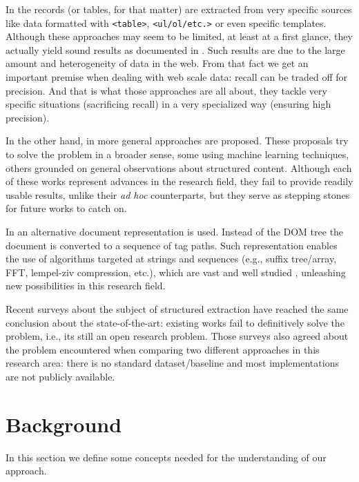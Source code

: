 \documentclass{vldb}
\begin{document}
In \cite{webtables2008, listExtract2009, tablesMS2012, tegra2015, topklists2013}
the records (or tables, for that matter) are extracted from very specific
sources like data formatted with \texttt{<table>}, \texttt{<ul/ol/etc.>} or even
specific templates. Although these approaches may seem to be limited, at least
at a first glance, they actually yield sound results as documented in
\cite{relationalWeb2008, probase, probase2012, acsdb}. Such results are due to
the large amount and heterogeneity of data in the web. From that fact we get an
important premise when dealing with web scale data: recall can be traded off for
precision. And that is what those approaches are all about, they tackle very
specific situations (sacrificing recall) in a very specialized way (ensuring
high precision).

In the other hand, in \cite{RRunner01, exalg2003, vips03, viper05, MDR03,
depta05, NET05, TPC09, vide10, gstm2010, fivatech2010, cvts2012, SuffixTree12,
clustVX2014, datapath2015, autorm2015} more general approaches are proposed.
These proposals try to solve the problem in a broader sense, some using machine
learning techniques, others grounded on general observations about structured
content. Although each of these works represent advances in the research field,
they fail to provide readily usable results, unlike their \textit{ad hoc}
counterparts, but they serve as stepping stones for future works to catch on.

In \cite{TPC09, SuffixTree12, TPS2013} an alternative document representation is
used. Instead of the DOM tree the document is converted to a sequence of tag
paths. Such representation enables the use of algorithms targeted at strings and
sequences (e.g., suffix tree/array\cite{ukkonen1995, manber1993suffix},
FFT\cite{fft1965}, lempel-ziv compression\cite{ziv1977universal}, etc.), which
are vast and well studied \cite{gusfield1997algorithms}, unleashing new
possibilities in this research field.

Recent surveys\cite{survey2013, survey2014} about the subject of structured
extraction have reached the same conclusion about the state-of-the-art: existing
works fail to definitively solve the problem, i.e., its still an open research
problem. Those surveys also agreed about the problem encountered when comparing
two different approaches in this research area: there is no standard
dataset/baseline and most implementations are not publicly available.

\section{Background}\label{sec:defs}
In this section we define some concepts needed for the understanding of our approach.
\end{document}
